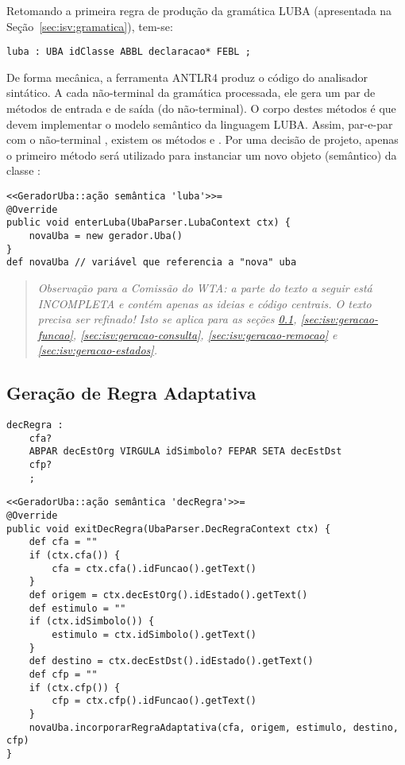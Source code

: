 Retomando a primeira regra de produção da gramática LUBA (apresentada na Seção~\ref{sec:isv:gramatica}), tem-se:

\begin{lstlisting}[style=antlr]
luba : UBA idClasse ABBL declaracao* FEBL ;
\end{lstlisting}

De forma mecânica, a ferramenta ANTLR4 produz o código do analisador sintático. A cada não-terminal da gramática processada, ele gera um par de métodos de entrada e de saída (do não-terminal). O corpo destes métodos é que devem implementar o modelo semântico da linguagem LUBA. Assim, par-e-par com o não-terminal , existem os métodos  e . Por uma decisão de projeto, apenas o primeiro método será utilizado para instanciar um novo objeto (semântico) da classe :

\begin{lstlisting}
<<GeradorUba::ação semântica 'luba'>>=
@Override
public void enterLuba(UbaParser.LubaContext ctx) {
    novaUba = new gerador.Uba()
}
def novaUba // variável que referencia a "nova" uba
\end{lstlisting}

   \begin{quote}
   \textit{Observação para a Comissão do WTA: a parte do texto a seguir está INCOMPLETA e contém apenas as ideias e código centrais. O texto precisa ser refinado! Isto se aplica para as seções \ref{sec:isv:geracao-regra}, \ref{sec:isv:geracao-funcao}, \ref{sec:isv:geracao-consulta}, \ref{sec:isv:geracao-remocao} e \ref{sec:isv:geracao-estados}.}
   \end{quote}

\subsection{Geração de Regra Adaptativa}
\label{sec:isv:geracao-regra}

\begin{lstlisting}[style=antlr]
decRegra :
	cfa?
	ABPAR decEstOrg VIRGULA idSimbolo? FEPAR SETA decEstDst
	cfp?
	;
\end{lstlisting}

\begin{lstlisting}
<<GeradorUba::ação semântica 'decRegra'>>=
@Override
public void exitDecRegra(UbaParser.DecRegraContext ctx) {
    def cfa = ""
    if (ctx.cfa()) {
        cfa = ctx.cfa().idFuncao().getText()
    }
    def origem = ctx.decEstOrg().idEstado().getText()
    def estimulo = ""
    if (ctx.idSimbolo()) {
        estimulo = ctx.idSimbolo().getText()
    }
    def destino = ctx.decEstDst().idEstado().getText()
    def cfp = ""
    if (ctx.cfp()) {
        cfp = ctx.cfp().idFuncao().getText()
    }
    novaUba.incorporarRegraAdaptativa(cfa, origem, estimulo, destino, cfp)
}
\end{lstlisting}

